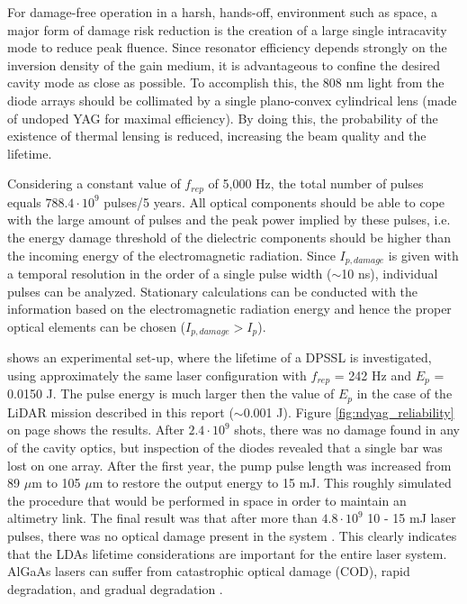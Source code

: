 For damage-free operation in a harsh, hands-off, environment such as space, a major form of damage risk reduction is the creation of a large single intracavity mode to reduce peak fluence. Since resonator efficiency depends strongly on the inversion density of the gain medium, it is advantageous to confine the desired cavity mode as close as possible. To accomplish this, the 808 nm light from the diode arrays should be collimated by a single plano-convex cylindrical lens (made of undoped YAG for maximal efficiency). By doing this, the probability of the existence of thermal lensing is reduced, increasing the beam quality and the lifetime. 

Considering a constant value of $f_{rep}$ of 5,000 Hz, the total number of pulses equals $788.4\cdot10^{9}$ pulses/5 years. All optical components should be able to cope with the large amount of pulses and the peak power implied by these pulses, i.e. the energy damage threshold of the dielectric components should be higher than the incoming energy of the electromagnetic radiation. Since $I_{p,damage}$ is given with a temporal resolution in the order of a single pulse width ($\sim$10 ns), individual pulses can be analyzed. Stationary calculations can be conducted with the information based on the electromagnetic radiation energy and hence the proper optical elements can be chosen ($I_{p,damage} > I_{p}$).

\cite{nd_yag_life} shows an experimental set-up, where the lifetime of a \acs{DPSSL} is investigated, using approximately the same \acs{laser} configuration with $f_{rep}$ = 242 Hz and $E_{p}$ = 0.0150 J. The pulse energy is much larger then the value of $E_{p}$ in the case of the \acs{LiDAR} mission described in this report ($\sim$0.001 J). Figure \ref{fig:ndyag_reliability} on page \pageref{fig:ndyag_reliability} shows the results. After $2.4\cdot10^{9}$ shots, there was no damage found in any of the cavity optics, but inspection of the diodes revealed that a single bar was lost on one array. After the first year, the pump pulse length was increased from 89 $\mu$m to 105 $\mu$m to restore the output energy to 15 mJ. This roughly simulated the procedure that would be performed in space in order to maintain an altimetry link. The final result was that after more than $4.8\cdot10^{9}$ 10 - 15 mJ laser pulses, there was no optical damage present in the system \cite{nd_yag_life}. This clearly indicates that the \acp{LDA} lifetime considerations are important for the entire \acs{laser} system. AlGaAs lasers can suffer from catastrophic optical damage (COD), rapid degradation, and gradual degradation \cite{algaas}.

